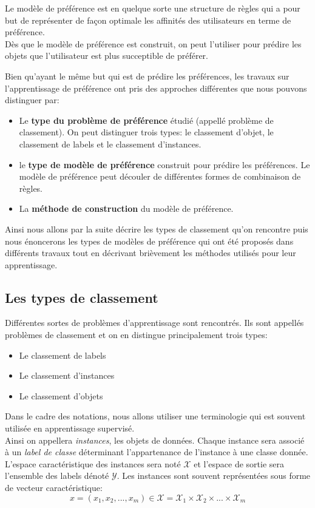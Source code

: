 \documentclass[a4paper,12pt,openany,oneside]{article}
\begin{document}
Le modèle de préférence est en quelque sorte une structure de règles qui a pour but de représenter de façon optimale les affinités des utilisateurs en terme de préférence.\\
Dès que le modèle de préférence est construit, on peut l'utiliser pour prédire les objets que l'utilisateur est plus succeptible de préférer.

Bien qu'ayant le même but qui est de prédire les préférences, les travaux sur l'apprentissage de préférence ont pris des approches différentes que nous pouvons distinguer par:

\begin{itemize}
\item Le \textbf{type du problème de préférence} étudié (appellé problème de classement). On peut distinguer trois types: le classement d'objet, le classement de labels et le classement d'instances.
\item le \textbf{type de modèle de préférence} construit pour prédire les préférences. Le modèle de préférence peut découler de différentes formes de combinaison de règles.
\item La \textbf{méthode de construction} du modèle de préférence.
\end{itemize}
 Ainsi nous allons par la suite décrire les types de classement qu'on rencontre puis nous énoncerons les types de modèles de préférence qui ont été proposés dans différents travaux tout en décrivant brièvement les méthodes utilisés pour leur apprentissage.

\subsection{Les types de classement}

Différentes sortes de problèmes d'apprentissage sont rencontrés. Ils sont appellés problèmes de classement et on en distingue principalement trois types:

\begin{itemize}
	\item Le classement de labels
	\item Le classement d'instances
	\item Le classement d'objets\\
\end{itemize}

Dans le cadre des notations, nous allons utiliser une terminologie qui est souvent utilisée en apprentissage supervisé. \\
Ainsi on appellera \textit{instances}, les objets de données. Chaque instance sera associé à un \textit{label de classe} déterminant l'appartenance de l'instance à une classe donnée. L'espace caractéristique des instances sera noté $\mathcal{X}$ et l'espace de sortie sera l'ensemble des labels dénoté $\mathcal{Y}$.
Les instances sont souvent représentées sous forme de vecteur caractéristique:
\[
x=(x_1,x_2,...,x_m)\in \mathcal{X}=\mathcal{X}_1\times \mathcal{X}_2\times ... \times \mathcal{X}_m
\]
\end{document}
